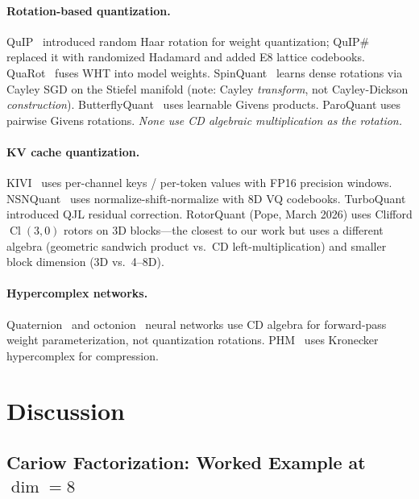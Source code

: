 \documentclass[sigconf,anonymous,review]{acmart}
\DeclareMathOperator{\Cl}{Cl}
\begin{document}
\paragraph{Rotation-based quantization.}
QuIP~\cite{quip2023} introduced random Haar rotation for weight
quantization; QuIP\#~\cite{quipsharp2024} replaced it with randomized
Hadamard and added E8 lattice codebooks. QuaRot~\cite{quarot2024}
fuses WHT into model weights. SpinQuant~\cite{spinquant2024} learns
dense rotations via Cayley SGD on the Stiefel manifold (note: Cayley
\emph{transform}, not Cayley-Dickson \emph{construction}).
ButterflyQuant~\cite{butterflyquant2025} uses learnable Givens
products. ParoQuant uses pairwise Givens rotations.
\emph{None use CD algebraic multiplication as the rotation.}

\paragraph{KV cache quantization.}
KIVI~\cite{kivi2024} uses per-channel keys / per-token values with
FP16 precision windows. NSNQuant~\cite{nsnquant2025} uses
normalize-shift-normalize with 8D VQ codebooks.
TurboQuant~\cite{turboquant2026} introduced QJL residual correction.
RotorQuant (Pope, March 2026) uses Clifford $\Cl(3,0)$ rotors on
3D blocks---the closest to our work but uses a different algebra
(geometric sandwich product vs.\ CD left-multiplication) and smaller
block dimension (3D vs.\ 4--8D).

\paragraph{Hypercomplex networks.}
Quaternion~\cite{parcollet2019} and octonion~\cite{zhu2019} neural
networks use CD algebra for forward-pass weight parameterization,
not quantization rotations. PHM~\cite{zhang2021} uses Kronecker
hypercomplex for compression.

\section{Discussion}
\label{sec:discussion}

\subsection{Cariow Factorization: Worked Example at $\dim=8$}
\end{document}

